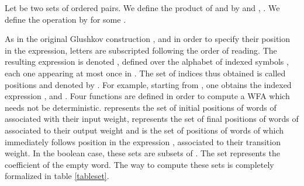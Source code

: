 \documentclass[11pt]{article}
\begin{document}
Let   be two sets of ordered pairs.
We define the product of  and  by   and 
, . 
 We define the operation  by  for some . 

As in the original Glushkov construction \cite{Glu60,MY60}, and in order to specify their position in the expression, 
letters are subscripted following the order of reading. The resulting expression is denoted  , defined over the 
alphabet of indexed symbols , each one appearing at most once in . The set of indices thus obtained is 
called positions and denoted by . For example, starting from 
, one obtains the indexed expression , 
 and  .
Four functions are defined in order to
compute a WFA which needs not be deterministic. 
represents the set of initial positions of words of  associated with their input weight,
 represents the set of final positions of words of  associated to their output weight and
 is the set of positions of words of  which immediately follows
position  in the expression , associated to their transition weight.  In the boolean case, these sets are subsets of . The  set represents 
the coefficient of the empty word. The way to compute these sets is completely formalized in table \ref{tableset}. 
\end{document}
